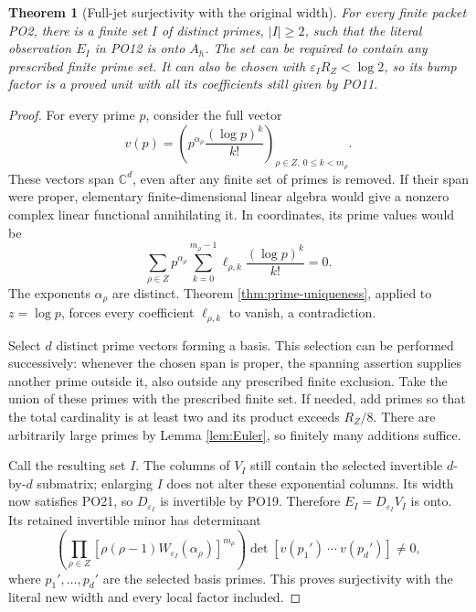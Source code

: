 \documentclass[11pt]{article}
\newtheorem{theorem}{Theorem}[section]
\newcommand{\C}{\mathbb C}
\newcommand{\eps}{\varepsilon}
\begin{document}
\begin{theorem}[Full-jet surjectivity with the original width]
\label{thm:onto}
For every finite packet PO2, there is a finite set \(I\) of
distinct primes, \(|I|\ge2\), such that the literal observation
\(E_I\) in PO12 is onto \(A_h\).
The set can be required to contain any prescribed finite prime
set. It can also be chosen with
\(\eps_I R_Z<\log2\), so its bump factor is a proved unit
with all its coefficients still given by PO11.
\end{theorem}
\begin{proof}
For every prime \(p\), consider the full vector
\[
 v(p)=
 \left(p^{\alpha_\rho}
            \frac{(\log p)^k}{k!}\right)_{\rho\in Z,\ 0\le k<m_\rho}.
 \tag{PO27}\label{po:prime-columns}
\]
These vectors span \(\C^d\), even after any finite set of
primes is removed. If their span were proper, elementary
finite-dimensional linear algebra would give a nonzero
complex linear functional annihilating it. In coordinates,
its prime values would be
\[
 \sum_{\rho\in Z}p^{\alpha_\rho}
       \sum_{k=0}^{m_\rho-1}\ell_{\rho,k}
                           \frac{(\log p)^k}{k!}=0 .
 \tag{PO28}
\]
The exponents \(\alpha_\rho\) are distinct. Theorem
\ref{thm:prime-uniqueness}, applied to \(z=\log p\), forces
every coefficient \(\ell_{\rho,k}\) to vanish, a contradiction.

Select \(d\) distinct prime vectors forming a basis. This
selection can be performed successively: whenever the
chosen span is proper, the spanning assertion supplies
another prime outside it, also outside any prescribed finite
exclusion. Take the union of these primes with the prescribed
finite set. If needed, add primes so that the total cardinality
is at least two and its product exceeds \(R_Z/8\). There
are arbitrarily large primes by Lemma \ref{lem:Euler}, so
finitely many additions suffice.

Call the resulting set \(I\). The columns of \(V_I\) still
contain the selected invertible \(d\)-by-\(d\) submatrix;
enlarging \(I\) does not alter these exponential columns.
Its width now satisfies PO21, so \(D_{\eps_I}\) is
invertible by PO19. Therefore \(E_I=D_{\eps_I}V_I\) is
onto. Its retained invertible minor has determinant
\[
 \left(\prod_{\rho\in Z}
 [\rho(\rho-1)W_{\eps_I}(\alpha_\rho)]^{m_\rho}\right)
       \det[v(p_1')\ \cdots\ v(p_d')]\ne0,
 \tag{PO29}\label{po:minor}
\]
where \(p_1',\ldots,p_d'\) are the selected basis primes.
This proves surjectivity with the literal new width and every
local factor included.
\end{proof}
\end{document}
